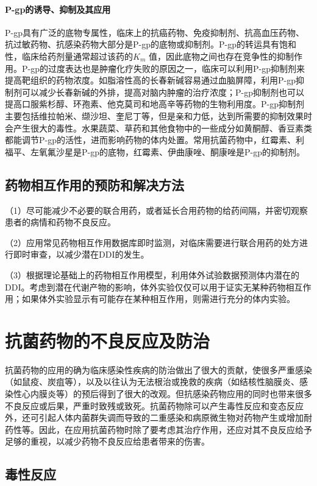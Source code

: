 \paragraph{P-gp的诱导、抑制及其应用}

P-gp具有广泛的底物专属性，临床上的抗癌药物、免疫抑制剂、抗高血压药物、抗过敏药物、抗感染药物大部分是P-gp的底物或抑制剂。P-gp的转运具有饱和性，临床给药剂量通常超过该药的$K_m$
值，因此底物之间也存在竞争性的抑制作用。P-gp的过度表达也是肿瘤化疗失败的原因之一，临床可以利用P-gp抑制剂来提高靶组织的药物浓度。如脂溶性高的长春新碱容易通过血脑屏障，利用P-gp抑制剂可以减少长春新碱的外排，提高对脑内肿瘤的治疗浓度；P-gp抑制剂也可以提高口服紫杉醇、环孢素、他克莫司和地高辛等药物的生物利用度。P-gp抑制剂主要包括维拉帕米、缬沙坦、奎尼丁等，但是亲和力低，达到所需要的抑制效果时会产生很大的毒性。水果蔬菜、草药和其他食物中的一些成分如黄酮醇、香豆素类都能调节P-gp的活性，进而影响药物的体内处置。常用抗菌药物中，红霉素、利福平、左氧氟沙星是P-gp的底物，红霉素、伊曲康唑、酮康唑是P-gp的抑制剂。

\subsection{药物相互作用的预防和解决方法}

（1）尽可能减少不必要的联合用药，或者延长合用药物的给药间隔，并密切观察患者的病情和药物不良反应。

（2）应用常见药物相互作用数据库即时监测，对临床需要进行联合用药的处方进行即时审查，以减少潜在DDI的发生。

（3）根据理论基础上的药物相互作用模型，利用体外试验数据预测体内潜在的DDI。考虑到潜在代谢产物的影响，体外实验仅仅可以用于证实无某种药物相互作用；如果体外实验显示有可能存在某种相互作用，则需进行充分的体内实验。

\section{抗菌药物的不良反应及防治}

抗菌药物的应用的确为临床感染性疾病的防治做出了很大的贡献，使很多严重感染（如鼠疫、炭疽等），以及以往认为无法根治或挽救的疾病（如结核性脑膜炎、感染性心内膜炎等）的预后得到了很大的改观。但抗感染药物应用的同时也带来很多不良反应或后果，严重时致残或致死。抗菌药物除可以产生毒性反应和变态反应外，还可引起人体内菌群失调而导致的二重感染和病原微生物对药物产生或增加耐药性等。因此，在应用抗菌药物时除了要考虑其治疗作用，还应对其不良反应给予足够的重视，以减少药物不良反应给患者带来的伤害。

\subsection{毒性反应}

